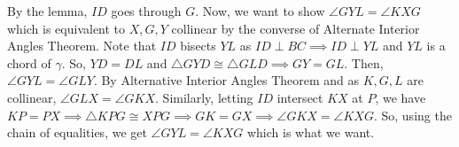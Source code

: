 \documentclass[11pt]{article}
\begin{document}
\begin{sol}
By the lemma, $ID$ goes through $G$. Now, we want to show $\angle GYL = \angle KXG$ which is equivalent to $X,G,Y$ collinear by the converse of Alternate Interior Angles Theorem.  Note that $ID$ bisects $YL$ as $ID\perp BC\implies ID\perp YL$ and $YL$ is a chord of $\gamma$. So, $YD=DL$ and $\triangle GYD \cong \triangle GLD\implies GY=GL$. Then, $\angle GYL = \angle GLY$. By Alternative Interior Angles Theorem and as $K,G,L$ are collinear, $\angle GLX=\angle GKX$. Similarly, letting $ID$ intersect $KX$ at $P$, we have $KP=PX\implies \triangle KPG \cong XPG\implies GK=GX\implies \angle GKX = \angle KXG$. So, using the chain of equalities, we get $\angle GYL = \angle KXG$ which is what we want.  
\end{sol}
\end{document}
